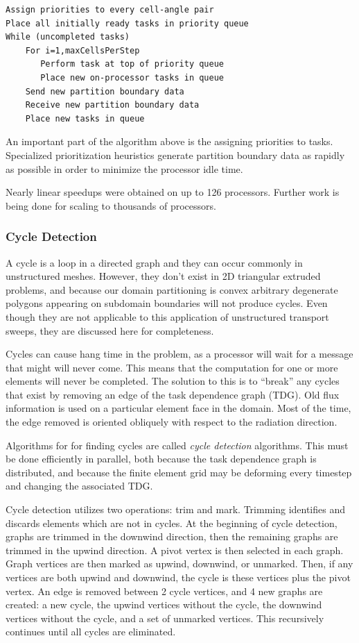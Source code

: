 \documentclass[11pt, letterpaper,titlepage,oneside]{article}
\begin{document}
\begin{verbatim}
Assign priorities to every cell-angle pair
Place all initially ready tasks in priority queue
While (uncompleted tasks)
    For i=1,maxCellsPerStep
       Perform task at top of priority queue
       Place new on-processor tasks in queue
    Send new partition boundary data
    Receive new partition boundary data
    Place new tasks in queue 
\end{verbatim}

An important part of the algorithm above is the assigning priorities to tasks. Specialized prioritization heuristics generate partition boundary data as rapidly as possible in order to minimize the processor idle time. 

Nearly linear speedups were obtained on up to 126 processors. Further work is being done for scaling to thousands of processors. 

\subsubsection{Cycle Detection}

A cycle is a loop in a directed graph and they can occur commonly in unstructured meshes. However, they don't exist in 2D triangular extruded problems, and because our domain partitioning is convex arbitrary degenerate polygons appearing on subdomain boundaries will not produce cycles. Even though they are not applicable to this application of unstructured transport sweeps, they are discussed here for completeness.

Cycles can cause hang time in the problem, as a processor will wait for a message that might will never come. This means that the computation for one or more elements will never be completed. The solution to this is to ``break'' any cycles that exist by removing an edge of the task dependence graph (TDG). Old flux information is used on a particular element face in the domain. Most of the time, the edge removed is oriented obliquely with respect to the radiation direction. 

Algorithms for for finding cycles are called \textit{cycle detection} algorithms. This must be done efficiently in parallel, both because the task dependence graph is distributed, and because the finite element grid may be deforming every timestep and changing the associated TDG.

Cycle detection utilizes two operations: trim and mark. Trimming identifies and discards elements which are not in cycles. At the beginning of cycle detection, graphs are trimmed in the downwind direction, then the remaining graphs are trimmed in the upwind direction. A pivot vertex is then selected in each graph. Graph vertices are then marked as upwind, downwind, or unmarked. Then, if any vertices are both upwind and downwind, the cycle is these vertices plus the pivot vertex. An edge is removed between 2 cycle vertices, and 4 new graphs are created: a new cycle, the upwind vertices without the cycle, the downwind vertices without the cycle, and a set of unmarked vertices. This recursively continues until all cycles are eliminated.
\end{document}
